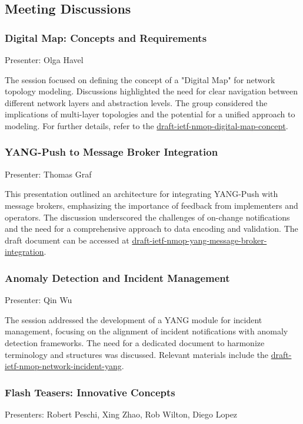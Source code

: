 \documentclass{article}
\begin{document}
\subsection{Meeting Discussions}

\subsubsection{Digital Map: Concepts and Requirements}
Presenter: Olga Havel

The session focused on defining the concept of a "Digital Map" for network topology modeling. Discussions highlighted the need for clear navigation between different network layers and abstraction levels. The group considered the implications of multi-layer topologies and the potential for a unified approach to modeling. For further details, refer to the \href{https://datatracker.ietf.org/doc/html/draft-ietf-nmop-digital-map-concept}{draft-ietf-nmop-digital-map-concept}.

\subsubsection{YANG-Push to Message Broker Integration}
Presenter: Thomas Graf

This presentation outlined an architecture for integrating YANG-Push with message brokers, emphasizing the importance of feedback from implementers and operators. The discussion underscored the challenges of on-change notifications and the need for a comprehensive approach to data encoding and validation. The draft document can be accessed at \href{https://datatracker.ietf.org/doc/html/draft-ietf-nmop-yang-message-broker-integration}{draft-ietf-nmop-yang-message-broker-integration}.

\subsubsection{Anomaly Detection and Incident Management}
Presenter: Qin Wu

The session addressed the development of a YANG module for incident management, focusing on the alignment of incident notifications with anomaly detection frameworks. The need for a dedicated document to harmonize terminology and structures was discussed. Relevant materials include the \href{https://datatracker.ietf.org/doc/html/draft-ietf-nmop-network-incident-yang}{draft-ietf-nmop-network-incident-yang}.

\subsubsection{Flash Teasers: Innovative Concepts}
Presenters: Robert Peschi, Xing Zhao, Rob Wilton, Diego Lopez
\end{document}
